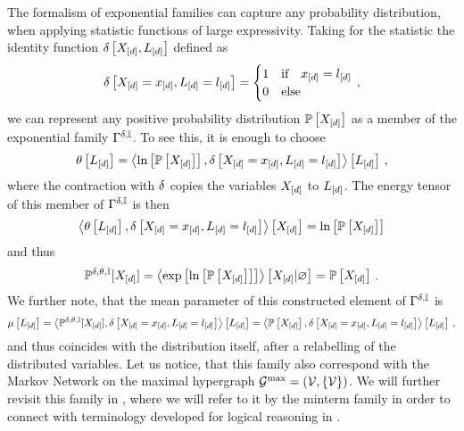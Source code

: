 The formalism of exponential families can capture any probability distribution, when applying statistic functions of large expressivity.
Taking for the statistic the identity function $\delta\left[X_{[d]},L_{[d]}\right]$ defined as
\begin{align*}
    \delta\left[X_{[d]}=x_{[d]},L_{[d]}=l_{[d]}\right]
    = \begin{cases}
          1 & \text{if} \quad x_{[d]} = l_{[d]} \\
          0 & \text{else}
     \end{cases} \, ,
\end{align*}
we can represent any positive probability distribution $\mathbb{P}\left[X_{[d]}\right]$ as a member of the exponential family $\Gamma^{\delta,\mathbb{I}}$.
To see this, it is enough to choose
\begin{align*}
    \theta\left[L_{[d]}\right] = \left\langle \ln \left[ \mathbb{P}\left[X_{[d]}\right] \right],\delta\left[X_{[d]}=x_{[d]},L_{[d]}=l_{[d]}\right]\right\rangle \left[ L_{[d]} \right] \, ,
\end{align*}
where the contraction with $\delta$ copies the variables $X_{[d]}$ to $L_{[d]}$.
The energy tensor of this member of $\Gamma^{\delta,\mathbb{I}}$ is then
\begin{align*}
   \left\langle \theta\left[L_{[d]}\right],\delta\left[X_{[d]}=x_{[d]},L_{[d]}=l_{[d]}\right]\right\rangle \left[ X_{[d]} \right]
    = \ln \left[ \mathbb{P}\left[X_{[d]}\right] \right]
\end{align*}
and thus
\begin{align*}
    \mathbb{P}^{\delta,\theta,\mathbb{I}}[X_{[d]}] = \left\langle \mathrm{exp}\left[\ln \left[ \mathbb{P}\left[X_{[d]}\right] \right]\right]\right\rangle \left[ X_{[d]} | \varnothing \right] = \mathbb{P}\left[X_{[d]}\right] \, .
\end{align*}
We further note, that the mean parameter of this constructed element of $\Gamma^{\delta,\mathbb{I}}$ is
\begin{align*}
    \mu\left[L_{[d]}\right]
    = \left\langle \mathbb{P}^{\delta,\theta,\mathbb{I}}[X_{[d]}],\delta\left[X_{[d]}=x_{[d]},L_{[d]}=l_{[d]}\right]\right\rangle \left[ L_{[d]} \right]
    = \left\langle \mathbb{P}\left[X_{[d]}\right],\delta\left[X_{[d]}=x_{[d]},L_{[d]}=l_{[d]}\right]\right\rangle \left[ L_{[d]} \right] \, ,
\end{align*}
and thus coincides with the distribution itself, after a relabelling of the distributed variables.
Let us notice, that this family also correspond with the Markov Network on the maximal hypergraph $\mathcal{G}^{\mathrm{max}}=(\mathcal{V},\{\mathcal{V}\})$.
We will further revisit this family in , where we will refer to it by the minterm family in order to connect with terminology developed for logical reasoning in .



